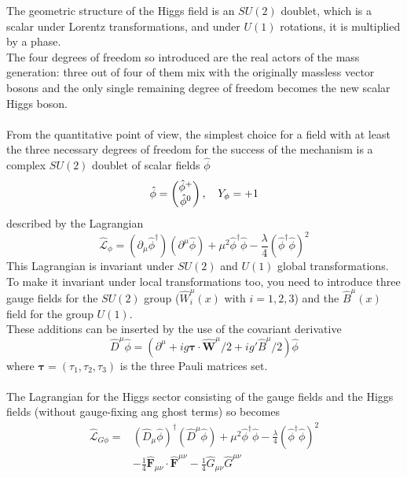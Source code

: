The geometric structure of the Higgs field is an $SU(2)$ doublet, which is a scalar under Lorentz transformations, and under $U(1)$ rotations, it is multiplied by a phase.
\\
The four degrees of freedom so introduced are the real actors of the mass generation: three out of four of them mix with the originally massless vector bosons and the only single remaining degree of freedom becomes the new scalar Higgs boson.
\\\\
From the quantitative point of view, the simplest choice for a field with at least the three necessary degrees of freedom for the success of the mechanism is a complex $SU(2)$ doublet of scalar fields $\hat{\phi}$
\begin{equation}
\hat{\phi} = \begin{pmatrix}
\hat{\phi}^+ \\ \hat{\phi}^0 
\end{pmatrix} \text{,} \hspace{0.4cm} Y_{\phi}=+1
\end{equation}
described by the Lagrangian
\begin{equation}
\hat{\mathcal{L}}_{\phi} = (\partial_{\mu}\hat{\phi}^\dag)(\partial^{\mu}\hat{\phi})+\mu^2\hat{\phi}^\dag\hat{\phi}-\frac{\lambda}{4}(\hat{\phi}^\dag\hat{\phi})^2
\label{Higgs_lagrangian}
\end{equation}
This Lagrangian is invariant under $SU(2)$ and $U(1)$ global transformations. To make it invariant under local transformations too, you need to introduce three gauge fields for the $SU(2)$ group ($\hat{W}_i^{\mu}(x)$ with $i=1,2,3$) and the $\hat{B}^{\mu}(x)$ field for the group $U(1)$. 
\\
These additions can be inserted by the use of the covariant derivative
\begin{equation}
\hat{D}^{\mu} \hat{\phi} = (\partial^{\mu} + ig \boldsymbol{\tau} \cdot \hat{\boldsymbol{W}}^{\mu} /2+ig'\hat{B}^{\mu} /2)\hat{\phi}
\end{equation}
where $\boldsymbol{\tau} = (\tau_1, \tau_2, \tau_3)$ is the three Pauli matrices set.
\\\\
The Lagrangian for the Higgs sector consisting of the gauge fields and the Higgs fields (without gauge-fixing ang ghost terms) so becomes
\begin{align}
\hat{\mathcal{L}}_{G\phi} = &(\hat{D}_{\mu}\hat{\phi})^{\dag}(\hat{D}^{\mu}\hat{\phi})+\mu^2\hat{\phi}^{\dag}\hat{\phi}-\frac{\lambda}{4}(\hat{\phi}^{\dag}\hat{\phi})^2 \\
&-\frac{1}{4}\hat{\boldsymbol{F}}_{\mu\nu}\cdot\hat{\boldsymbol{F}}^{\mu\nu}-\frac{1}{4}\hat{G}_{\mu\nu}\hat{G}^{\mu\nu}
\label{Higgs_local_invariant}
\end{align}
